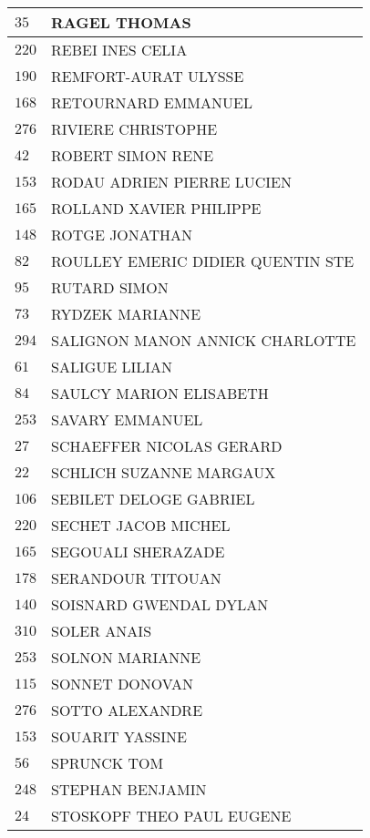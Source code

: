 \begin{xltabular}{\linewidth}{|l|X|}
    \hline
    $35$ & RAGEL THOMAS \\
    \hline
    $220$ & REBEI INES CELIA \\
    \hline
    $190$ & REMFORT-AURAT ULYSSE \\
    \hline
    $168$ & RETOURNARD EMMANUEL \\
    \hline
    $276$ & RIVIERE CHRISTOPHE \\
    \hline
    $42$ & ROBERT SIMON RENE \\
    \hline
    $153$ & RODAU ADRIEN PIERRE LUCIEN \\
    \hline
    $165$ & ROLLAND XAVIER PHILIPPE \\
    \hline
    $148$ & ROTGE JONATHAN \\
    \hline
    $82$ & ROULLEY EMERIC DIDIER QUENTIN STE \\
    \hline
    $95$ & RUTARD SIMON \\
    \hline
    $73$ & RYDZEK MARIANNE \\
    \hline
    $294$ & SALIGNON MANON ANNICK CHARLOTTE \\
    \hline
    $61$ & SALIGUE LILIAN \\
    \hline
    $84$ & SAULCY MARION ELISABETH \\
    \hline
    $253$ & SAVARY EMMANUEL \\
    \hline
    $27$ & SCHAEFFER NICOLAS GERARD \\
    \hline
    $22$ & SCHLICH SUZANNE MARGAUX \\
    \hline
    $106$ & SEBILET DELOGE GABRIEL \\
    \hline
    $220$ & SECHET JACOB MICHEL \\
    \hline
    $165$ & SEGOUALI SHERAZADE \\
    \hline
    $178$ & SERANDOUR TITOUAN \\
    \hline
    $140$ & SOISNARD GWENDAL DYLAN \\
    \hline
    $310$ & SOLER ANAIS \\
    \hline
    $253$ & SOLNON MARIANNE \\
    \hline
    $115$ & SONNET DONOVAN \\
    \hline
    $276$ & SOTTO ALEXANDRE \\
    \hline
    $153$ & SOUARIT YASSINE \\
    \hline
    $56$ & SPRUNCK TOM \\
    \hline
    $248$ & STEPHAN BENJAMIN \\
    \hline
    $24$ & STOSKOPF THEO PAUL EUGENE \\

\end{xltabular}

